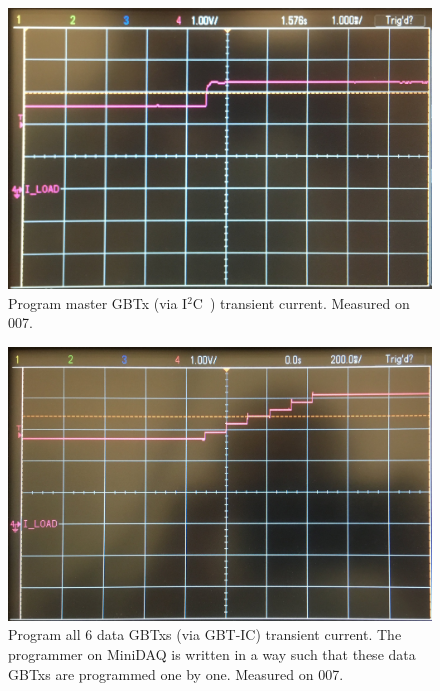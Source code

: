 \documentclass[11pt,letterpaper]{refart}
\def\itwoc{I{$\scriptstyle^2$}C\ }
\begin{document}
\begin{figure}[ht]
    \centering
    \includegraphics[width=0.8\linewidth]
        {./res/current_transient/program_master.jpg}
    \caption{
        Program master GBTx (via \itwoc) transient current.
        Measured on 007.
    }
\end{figure}

\begin{figure}[ht]
    \centering
    \includegraphics[width=0.8\linewidth]
        {./res/current_transient/program_data.jpg}
    \caption{
        Program all 6 data GBTxs (via GBT-IC) transient current.
        The programmer on MiniDAQ is written in a way such that these data GBTxs
        are programmed one by one.
        Measured on 007.
    }
\end{figure}
\end{document}
